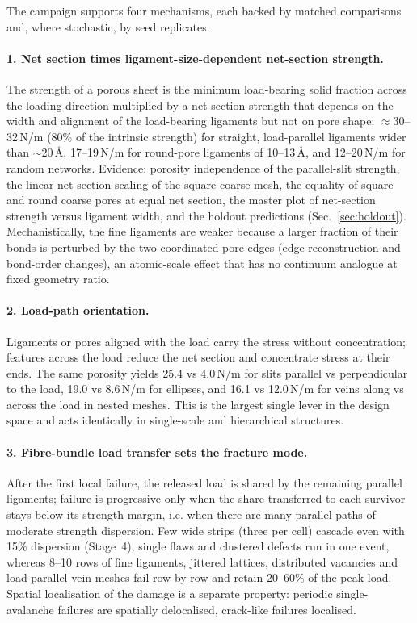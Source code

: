 The campaign supports four mechanisms, each backed by matched comparisons and, where stochastic, by seed replicates.

\paragraph{1. Net section times ligament-size-dependent net-section strength.} The strength of a porous sheet is the minimum load-bearing solid fraction across the loading direction multiplied by a net-section strength that depends on the width and alignment of the load-bearing ligaments but not on pore shape: $\approx$30--32\,N/m (80\% of the intrinsic strength) for straight, load-parallel ligaments wider than $\sim$20\,\AA, 17--19\,N/m for round-pore ligaments of 10--13\,\AA, and 12--20\,N/m for random networks. Evidence: porosity independence of the parallel-slit strength, the linear net-section scaling of the square coarse mesh, the equality of square and round coarse pores at equal net section, the master plot of net-section strength versus ligament width, and the holdout predictions (Sec.~\ref{sec:holdout}). Mechanistically, the fine ligaments are weaker because a larger fraction of their bonds is perturbed by the two-coordinated pore edges (edge reconstruction and bond-order changes), an atomic-scale effect that has no continuum analogue at fixed geometry ratio.

\paragraph{2. Load-path orientation.} Ligaments or pores aligned with the load carry the stress without concentration; features across the load reduce the net section and concentrate stress at their ends. The same porosity yields 25.4 vs 4.0\,N/m for slits parallel vs perpendicular to the load, 19.0 vs 8.6\,N/m for ellipses, and 16.1 vs 12.0\,N/m for veins along vs across the load in nested meshes. This is the largest single lever in the design space and acts identically in single-scale and hierarchical structures.

\paragraph{3. Fibre-bundle load transfer sets the fracture mode.} After the first local failure, the released load is shared by the remaining parallel ligaments; failure is progressive only when the share transferred to each survivor stays below its strength margin, i.e. when there are many parallel paths of moderate strength dispersion. Few wide strips (three per cell) cascade even with 15\% dispersion (Stage~4), single flaws and clustered defects run in one event, whereas 8--10 rows of fine ligaments, jittered lattices, distributed vacancies and load-parallel-vein meshes fail row by row and retain 20--60\% of the peak load. Spatial localisation of the damage is a separate property: periodic single-avalanche failures are spatially delocalised, crack-like failures localised.


